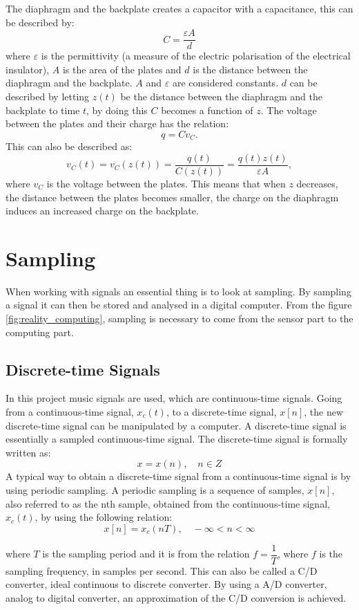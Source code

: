\noindent The diaphragm and the backplate creates a capacitor with a capacitance, this can be described by:
$$ C = \dfrac{\varepsilon A}{d}$$ 
\indent where $\varepsilon$ is the permittivity (a measure of the electric polarisation of the electrical insulator), $A$ is the area of the plates and $d$ is the distance between the diaphragm and the backplate. $A$ and $\varepsilon$ are considered constants. $d$ can be described by letting $z(t)$ be the distance between the diaphragm and the backplate to time $t$, by doing this $C$ becomes a function of $z$. The voltage between the plates and their charge has the relation:
$$q=C v_C.$$
This can also be described as:
$$v_C(t)=v_C(z(t))= \dfrac{q(t)}{C(z(t))} = \dfrac{q(t)z(t)}{\varepsilon A},$$
\indent where $v_C$ is the voltage between the plates. This means that when $z$ decreases, the distance between the plates becomes smaller, the charge on the diaphragm induces an increased charge on the backplate. 
\cite[p. 160-161]{LectureNotes}


\section{Sampling}

When working with signals an essential thing is to look at sampling. By sampling a signal it can then be stored and analysed in a digital computer. From the figure \ref{fig:reality_computing}, sampling is necessary to come from the sensor part to the computing part.  \\ 

\subsection{Discrete-time Signals}
In this project music signals are used, which are continuous-time signals. Going from a continuous-time signal, $x_c(t)$, to a discrete-time signal, $x[n]$, the new discrete-time signal can be manipulated by a computer. A discrete-time signal is essentially a sampled continuous-time signal. The discrete-time signal is formally written as:
$$x={x(n)}, \quad    n \in Z$$
A typical way to obtain a discrete-time signal from a continuous-time signal is by using periodic sampling. A periodic sampling is a sequence of samples, $x[n]$, also referred to as the nth sample, obtained from the continuous-time signal, $x_c(t)$, by using the following relation:
$$x[n]=x_c (nT), \quad    - \infty <n< \infty$$

where $T$ is the sampling period and it is from the relation $f=\dfrac{1}{T}$, where $f$ is the sampling frequency, in samples per second. This can also be called a C/D converter, ideal continuous to discrete converter. 
By using a A/D converter, analog to digital converter, an approximation of the C/D conversion is achieved. \cite[p. 140-142]{DiscreteTimeSignal}\\
